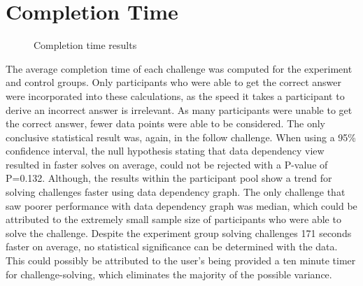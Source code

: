 \section{Completion Time}


\begin{figure}[!htb]
    \caption{Completion time results}
    \label{fig:time}
\end{figure}
The average completion time of each challenge was computed for the experiment and control groups. Only participants who were able to get the correct answer were incorporated into these calculations, as the speed it takes a participant to derive an incorrect answer is irrelevant. As many participants were unable to get the correct answer, fewer data points were able to be considered. The only conclusive statistical result was, again, in the follow challenge. When using a 95\% confidence interval, the null hypothesis stating that data dependency view resulted in faster solves on average, could not be rejected with a P-value of P=0.132. Although, the results within the participant pool show a trend for solving challenges faster using data dependency graph. The only challenge that saw poorer performance with data dependency graph was median, which could be attributed to the extremely small sample size of participants who were able to solve the challenge. Despite the experiment group solving challenges 171 seconds faster on average, no statistical significance can be determined with the data. This could possibly be attributed to the user's being provided a ten minute timer for challenge-solving, which eliminates the majority of the possible variance.

